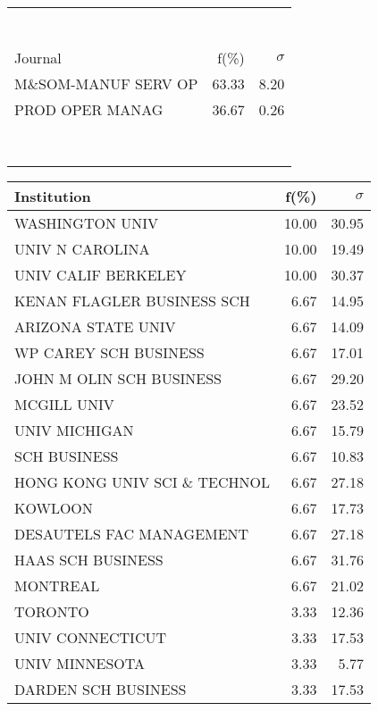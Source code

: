\documentclass[a4paper,11pt]{report}
\begin{document}
\begin{landscape}
\begin{table}[!ht]
{\begin{tabular}{|l r r|}
 &  & \\
 &  & \\
 &  & \\
 &  & \\
 &  & \\
 &  & \\
 &  & \\
\hline
\hline
Journal & f(\%) & $\sigma$\\
\hline
M\&SOM-MANUF SERV OP & 63.33 & 8.20\\
PROD OPER MANAG & 36.67 & 0.26\\
 &  & \\
 &  & \\
 &  & \\
 &  & \\
 &  & \\
 &  & \\
 &  & \\
 &  & \\
\hline
\end{tabular}
}
{\scriptsize\begin{tabular}{|l r r|}
\hline
Institution & f(\%) & $\sigma$\\
\hline
WASHINGTON UNIV & 10.00 & 30.95\\
UNIV N CAROLINA & 10.00 & 19.49\\
UNIV CALIF BERKELEY & 10.00 & 30.37\\
KENAN FLAGLER BUSINESS SCH & 6.67 & 14.95\\
ARIZONA STATE UNIV & 6.67 & 14.09\\
WP CAREY SCH BUSINESS & 6.67 & 17.01\\
JOHN M OLIN SCH BUSINESS & 6.67 & 29.20\\
MCGILL UNIV & 6.67 & 23.52\\
UNIV MICHIGAN & 6.67 & 15.79\\
SCH BUSINESS & 6.67 & 10.83\\
HONG KONG UNIV SCI \& TECHNOL & 6.67 & 27.18\\
KOWLOON & 6.67 & 17.73\\
DESAUTELS FAC MANAGEMENT & 6.67 & 27.18\\
HAAS SCH BUSINESS & 6.67 & 31.76\\
MONTREAL & 6.67 & 21.02\\
TORONTO & 3.33 & 12.36\\
UNIV CONNECTICUT & 3.33 & 17.53\\
UNIV MINNESOTA & 3.33 & 5.77\\
DARDEN SCH BUSINESS & 3.33 & 17.53\\

\end{tabular}}
\end{table}
\end{landscape}
\end{document}
